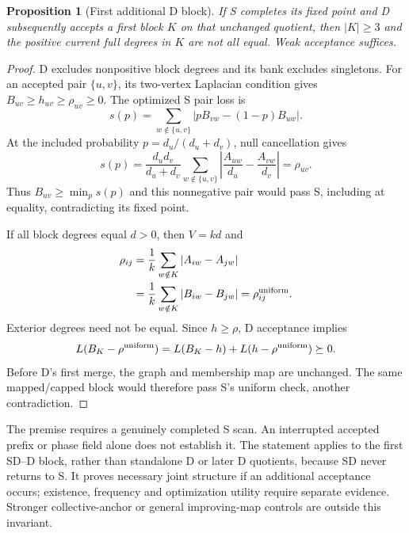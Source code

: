 \documentclass[sigconf,anonymous,review]{acmart}
\newtheorem{proposition}{Proposition}
\newcommand{\1}{\mathbf{1}}
\begin{document}
\begin{proposition}[First additional D block]\label{prop:sd-first-d}
If S completes its fixed point and D subsequently accepts a first block $K$
on that unchanged quotient, then $|K|\ge3$ and the positive current full
degrees in $K$ are not all equal. Weak acceptance suffices.
\end{proposition}
\begin{proof}
D excludes nonpositive block degrees and its bank excludes singletons.
For an accepted pair $\{u,v\}$, its two-vertex Laplacian condition gives
$B_{uv}\ge h_{uv}\ge\rho_{uv}\ge0$.
The optimized S pair loss is
\[
 s(p)=\sum_{w\notin\{u,v\}}|pB_{vw}-(1-p)B_{uw}|.
\]
At the included probability $p=d_u/(d_u+d_v)$, null cancellation gives
\[
 s(p)=\frac{d_ud_v}{d_u+d_v}
  \sum_{w\notin\{u,v\}}
  \left|\frac{A_{uw}}{d_u}-\frac{A_{vw}}{d_v}\right|
  =\rho_{uv}.
\]
Thus $B_{uv}\ge\min_p s(p)$ and this nonnegative pair would pass S,
including at equality, contradicting its fixed point.

If all block degrees equal $d>0$, then $V=kd$ and
\begin{align*}
 \rho_{ij}&=\frac1k\sum_{w\notin K}|A_{iw}-A_{jw}|\\
          &=\frac1k\sum_{w\notin K}|B_{iw}-B_{jw}|
           =\rho^{\rm uniform}_{ij}.
\end{align*}
Exterior degrees need not be equal. Since $h\ge\rho$, D acceptance implies
\[
 L(B_K-\rho^{\rm uniform})
 =L(B_K-h)+L(h-\rho^{\rm uniform})\succeq0.
\]
Before D's first merge, the graph and membership map are unchanged.
The same mapped/capped block would therefore pass S's uniform check,
another contradiction.
\end{proof}

The premise requires a genuinely completed S scan. An interrupted accepted
prefix or phase field alone does not establish it. The statement applies to
the first SD--D block, rather than standalone D or later D quotients, because
SD never returns to S. It proves necessary joint structure if an additional
acceptance occurs; existence, frequency and optimization utility require
separate evidence. Stronger collective-anchor or general improving-map
controls are outside this invariant.
\end{document}
